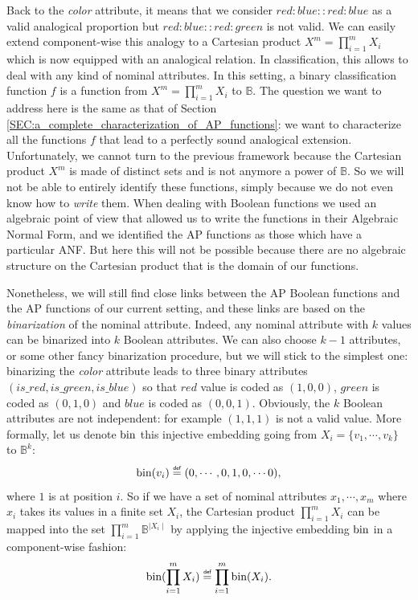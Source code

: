Back to the \textit{color} attribute, it means that we consider
$red:blue::red:blue$ as a valid analogical proportion but $red:blue::red:green$
is not valid. We can easily extend component-wise this analogy to a Cartesian
product $X^m=\prod_{i=1}^m X_i$ which is now equipped with an analogical
relation. In classification, this allows to deal with any kind of nominal
attributes.  In this setting, a binary classification function $f$ is a
function from $X^m=\prod_{i=1}^m X_i$ to $\mathbb{B}$. The question we want to
address here is the same as that of Section
\ref{SEC:a_complete_characterization_of_AP_functions}: we want to characterize all
the functions $f$ that lead to a perfectly sound analogical extension.
Unfortunately, we cannot turn to the previous framework because the Cartesian
product $X^m$ is made of distinct sets and is not anymore a power of
$\mathbb{B}$. So we will not be able to entirely identify these functions,
simply because we do not even know how to \textit{write} them. When dealing
with Boolean functions we used an algebraic point of view that allowed us
to write the functions in their Algebraic Normal Form, and we identified the AP
functions as those which have a particular ANF. But here this will not be
possible because there are no algebraic structure on the Cartesian product that
is the domain of our functions.

Nonetheless, we will still find close links between the AP Boolean functions
and the AP functions of our current setting, and these links are based on the
\textit{binarization} of the nominal attribute. Indeed, any nominal attribute
with $k$ values can be binarized into $k$ Boolean attributes. We can also choose
$k- 1$ attributes, or some other fancy binarization procedure, but we will
stick to the simplest one:
binarizing the \textit{color} attribute leads to three binary attributes
$(is\_red, is\_green, is\_blue)$ so that $red$ value is coded as $(1, 0, 0)$,
$green$ is coded as $(0, 1 , 0)$ and $blue$ is coded as $(0, 0, 1)$. Obviously,
the $k$ Boolean attributes are not independent: for example $(1, 1, 1)$  is not
a valid value.  More formally, let us denote $\text{bin}$ this injective embedding
going from $X_i=\{v_1, \cdots, v_k\}$ to $\mathbb{B}^k$:
$$\bin(v_i) \eqdef (0, \cdots, 0, 1, 0, \cdots 0),$$
where $1$ is at position $i$.  So if we have a set of nominal attributes $x_1,
\cdots, x_m$ where $x_i$ takes its values in a finite set $X_i$, the Cartesian
product  $\prod_{i=1}^m X_i$ can be mapped into the set $\prod_{i=1}^m
\mathbb{B}^{\mid X_i \mid}$ by applying the injective embedding $\text{bin}$ in a
component-wise fashion:
$$\bin(\prod_{i=1}^m X_i) \eqdef \prod_{i=1}^m  \bin(X_i).$$

